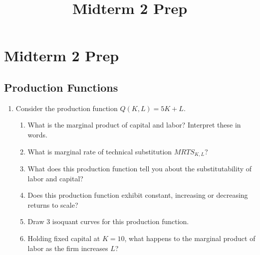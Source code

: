 \documentclass[11pt]{article}
\title{Midterm 2 Prep}
\newcommand{\answer}[1]{\iftoggle{INCLUDEANSWERS}{{\color{violet!70!white}\textbf{Solution:} #1}}{}}
\begin{document}
  
\section*{Midterm 2 Prep}

\subsection*{Production Functions}
\begin{enumerate}
  \item Consider the production function $Q(K, L) = 5K + L$. 
  \begin{enumerate}
    \item What is the marginal product of capital and labor? Interpret these in words.
    
    \item What is marginal rate of technical substitution $MRTS_{K, L}$? 
    
    \item What does this production function tell you about the substitutability of labor and capital?
    
    \item Does this production function exhibit constant, increasing or decreasing returns to scale?
    
    \item Draw 3 isoquant curves for this production function.
    
    \item Holding fixed capital at $K = 10$, what happens to the marginal product of labor as the firm increases $L$?
  \end{enumerate}

  \answer{
    \begin{enumerate}
      \item $MP_K = 5$ and $MP_L = 1$. For each additional unit of labor, one additional unit of output is produced. For each additional unit of capital used, one additional unit of output is produced.
      
      \item $MRTS_{K,L} = \frac{MP_L}{MP_K} = 1/5$. For every unit of labor the producer gives up, they need 1/5 unit of capital to produce the same output as before.
      
      \item Increasing returns to scale. $Q(\phi K, \phi L) = 5 \phi K \phi L = \phi^2 Q(K, L)$.
      
      \item Lines with a slop of $-1/5$.
      

\end{enumerate}}
\end{enumerate}
\end{document}
